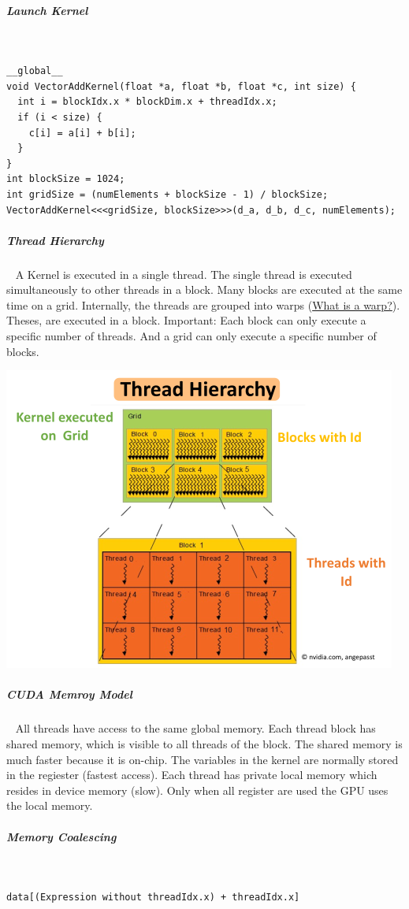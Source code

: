 \documentclass[8pt,twoside,landscape]{extarticle}
\begin{document}
\begin{multicols}{5}
\subparagraph{Launch Kernel} \
\label{sec:orgb988624}
\lstset{language=C,label= ,caption= ,captionpos=b,numbers=none}
\begin{lstlisting}
__global__
void VectorAddKernel(float *a, float *b, float *c, int size) {
  int i = blockIdx.x * blockDim.x + threadIdx.x;
  if (i < size) {
    c[i] = a[i] + b[i];
  }
}
int blockSize = 1024;
int gridSize = (numElements + blockSize - 1) / blockSize;
VectorAddKernel<<<gridSize, blockSize>>>(d_a, d_b, d_c, numElements);
\end{lstlisting}
\subparagraph{Thread Hierarchy} \
\label{sec:org8a807c7}
A Kernel is executed in a single thread.
The single thread is executed simultaneously to other threads in a block.
Many blocks are executed at the same time on a grid.
Internally, the threads are grouped into warps (\href{../../../roam/20220519072603-what_is_a_warp.org}{What is a warp?}).
Theses, are executed in a block.
Important: Each block can only execute a specific number of threads.
And a grid can only execute a specific number of blocks.

{
\begin{center}
\includegraphics[width=.9\linewidth]{img/thread_hierarchy.png}
\end{center}
\captionof{figure}{Thread Hierarchy on GPU}\label{fig:thread-hierarchy-on-gpu}
}
\subparagraph{CUDA Memroy Model} \
\label{sec:org5b45a08}
All threads have access to the same global memory.
Each thread block has shared memory, which is visible to all threads of the block.
The shared memory is much faster because it is on-chip.
The variables in the kernel are normally stored in the regiester (fastest access).
Each thread has private local memory which resides in device memory (slow).
Only when all register are used the GPU uses the local memory.
\subparagraph{Memory Coalescing} \
\label{sec:org5ae39e7}
\lstset{language=C,label= ,caption= ,captionpos=b,numbers=none}
\begin{lstlisting}
data[(Expression without threadIdx.x) + threadIdx.x]
\end{lstlisting}


\end{multicols}
\end{document}
